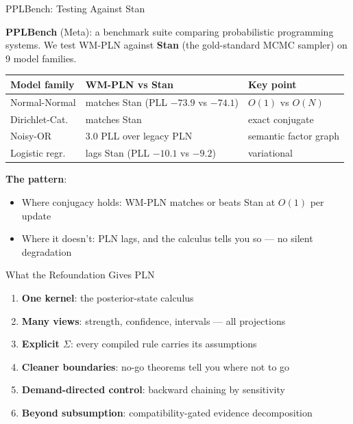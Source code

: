 \documentclass[aspectratio=169,11pt]{beamer}
\begin{document}
\begin{frame}{PPLBench: Testing Against Stan}

\textbf{PPLBench} (Meta): a benchmark suite comparing probabilistic
programming systems.  We test WM-PLN against \textbf{Stan}
(the gold-standard MCMC sampler) on 9 model families.

\medskip
{\small
\begin{tabular}{lll}
\toprule
\textbf{Model family} & \textbf{WM-PLN vs Stan} & \textbf{Key point} \\
\midrule
Normal-Normal & \alert{matches Stan} (PLL $-73.9$ vs $-74.1$) & $O(1)$ vs $O(N)$ \\
Dirichlet-Cat. & \alert{matches Stan} & exact conjugate \\
Noisy-OR & \alert{3.0 PLL over legacy PLN} & semantic factor graph \\
Logistic regr. & lags Stan (PLL $-10.1$ vs $-9.2$) & variational \\
\bottomrule
\end{tabular}}

\medskip
\textbf{The pattern}:
\begin{itemize}
\item Where conjugacy holds: WM-PLN \alert{matches or beats Stan}
  at $O(1)$ per update
\item Where it doesn't: PLN lags, and the calculus
  \alert{tells you so} --- no silent degradation
\end{itemize}

\end{frame}

\begin{frame}{What the Refoundation Gives PLN}

\begin{enumerate}
\item \textbf{One kernel}: the posterior-state calculus
\item \textbf{Many views}: strength, confidence, intervals --- all projections
\item \textbf{Explicit $\Sigma$}: every compiled rule carries its assumptions
\item \textbf{Cleaner boundaries}: no-go theorems tell you where not to go
\item \textbf{Demand-directed control}: backward chaining by sensitivity
\item \textbf{Beyond subsumption}: compatibility-gated evidence decomposition
\end{enumerate}

\end{frame}
\end{document}
